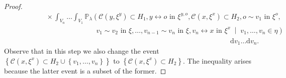 \documentclass[10pt,a4paper,dvipsnames]{article}
\theoremstyle{definition}
\theoremstyle{remark}
\newcommand{\pla}{\mathbb P_\lambda}
\newcommand{\dd}{\mathrm{d}} %
\newcommand{\C}{\mathscr {C}}
\newcommand{\conn}[3]{#1 \longleftrightarrow #2\textrm { in } #3}
\newcommand{\adja}[3]{#1 \sim #2\textrm { in } #3}
\newcommand{\orig}{o}
\numberwithin{equation}{section}
\begin{document}
\begin{proof}
\begin{align}
        &\hspace{2cm}\times\int_{V_n}\ldots\int_{V_1}\pla\left(\C\left(y,\xi^{y}\right)\subset H_1, \conn{y}{\orig}{\xi^{y,\orig}}, \C\left(x,\xi^{x}\right)\subset  H_2,\adja{\orig}{v_1}{\xi^{\orig}},\right.\nonumber\\
        &\hspace{5cm}\left.\adja{v_1}{v_2}{\xi},\ldots,\adja{v_{n-1}}{v_n}{\xi},\conn{v_n}{x}{\xi^x}\;\middle|\;v_1,\ldots,v_n\in\eta\right)\nonumber\\
        &\hspace{13cm}\dd v_1\ldots\dd v_n.
    \end{align}
    Observe that in this step we also change the event $\left\{\C\left(x,\xi^{x}\right)\subset  H_2\cup\left\{v_1,\ldots,v_n\right\}\right\}$ to $\left\{\C\left(x,\xi^{x}\right)\subset  H_2\right\}$. The inequality arises because the latter event is a subset of the former.


\end{proof}
\end{document}
